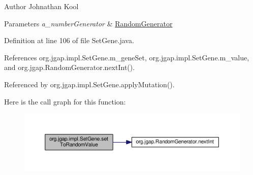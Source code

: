 \begin{DoxyAuthor}{Author}
Johnathan Kool
\end{DoxyAuthor}

\begin{DoxyParams}{Parameters}
{\em a\-\_\-number\-Generator} & \hyperlink{interfaceorg_1_1jgap_1_1_random_generator}{Random\-Generator} \\
\hline
\end{DoxyParams}


Definition at line 106 of file Set\-Gene.\-java.



References org.\-jgap.\-impl.\-Set\-Gene.\-m\-\_\-gene\-Set, org.\-jgap.\-impl.\-Set\-Gene.\-m\-\_\-value, and org.\-jgap.\-Random\-Generator.\-next\-Int().



Referenced by org.\-jgap.\-impl.\-Set\-Gene.\-apply\-Mutation().



Here is the call graph for this function\-:
\nopagebreak
\begin{figure}[H]
\begin{center}
\leavevmode
\includegraphics[width=350pt]{classorg_1_1jgap_1_1impl_1_1_set_gene_a878678824034193a549e71c820f1bc7e_cgraph}
\end{center}
\end{figure}


